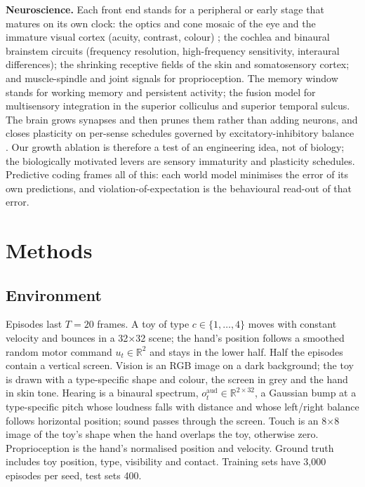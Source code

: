 \documentclass[
]{article}
\begin{document}
\textbf{Neuroscience.} Each front end stands for a peripheral or early
stage that matures on its own clock: the optics and cone mosaic of the
eye and the immature visual cortex (acuity, contrast, colour)
\citep{banks1988optical}; the cochlea and binaural brainstem circuits
(frequency resolution, high-frequency sensitivity, interaural
differences); the shrinking receptive fields of the skin and
somatosensory cortex; and muscle-spindle and joint signals for
proprioception. The memory window stands for working memory and
persistent activity; the fusion model for multisensory integration in
the superior colliculus and superior temporal sulcus. The brain grows
synapses and then prunes them \citep{huttenlocher1997regional} rather
than adding neurons, and closes plasticity on per-sense schedules
governed by excitatory-inhibitory balance \citep{hensch2005critical}.
Our growth ablation is therefore a test of an engineering idea, not of
biology; the biologically motivated levers are sensory immaturity and
plasticity schedules. Predictive coding frames all of this: each world
model minimises the error of its own predictions, and
violation-of-expectation is the behavioural read-out of that error.

\hypertarget{methods}{%
\section{Methods}\label{methods}}

\hypertarget{environment}{%
\subsection{Environment}\label{environment}}

Episodes last \(T=20\) frames. A toy of type \(c\in\{1,\dots,4\}\) moves
with constant velocity and bounces in a 32×32 scene; the hand's position
follows a smoothed random motor command \(u_t\in\mathbb R^2\) and stays
in the lower half. Half the episodes contain a vertical screen. Vision
is an RGB image on a dark background; the toy is drawn with a
type-specific shape and colour, the screen in grey and the hand in skin
tone. Hearing is a binaural spectrum,
\(o^{\text{aud}}_t\in\mathbb R^{2\times32}\), a Gaussian bump at a
type-specific pitch whose loudness falls with distance and whose
left/right balance follows horizontal position; sound passes through the
screen. Touch is an 8×8 image of the toy's shape when the hand overlaps
the toy, otherwise zero. Proprioception is the hand's normalised
position and velocity. Ground truth includes toy position, type,
visibility and contact. Training sets have 3,000 episodes per seed, test
sets 400.
\end{document}
